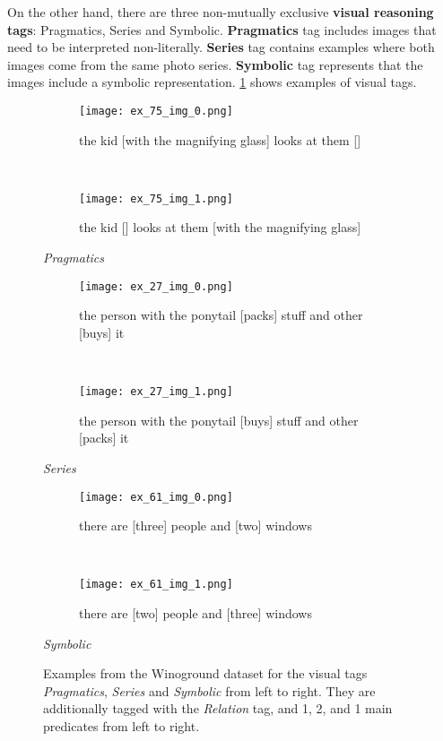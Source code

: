 On the other hand, there are three non-mutually exclusive \textbf{visual reasoning tags}: Pragmatics, Series and Symbolic. \textbf{Pragmatics} tag includes images that need to be interpreted non-literally. \textbf{Series} tag contains examples where both images come from the same photo series. \textbf{Symbolic} tag represents that the images include a symbolic representation. \cref{fig:winoground-examples-visual} shows examples of visual tags.

\begin{figure}[ht]
\centering
    \begin{minipage}{.30\textwidth}
        \begin{subfigure}{\textwidth}
        \centering
        \texttt{[image: ex\_75\_img\_0.png]}
        \caption{the kid [with the magnifying glass] looks at them []}
        \end{subfigure}\\
        \begin{subfigure}{\textwidth}
        \centering
        \texttt{[image: ex\_75\_img\_1.png]}
        \caption{the kid [] looks at them [with the magnifying glass]}
        \end{subfigure}%
        \caption*{\textit{Pragmatics}}
    \end{minipage}
    \hfill
    \begin{minipage}{.30\textwidth}
        \begin{subfigure}{\textwidth}
        \centering
        \texttt{[image: ex\_27\_img\_0.png]}
        \caption{the person with the ponytail [packs] stuff and other [buys] it}
        \end{subfigure}\\
        \begin{subfigure}{\textwidth}
        \centering
        \texttt{[image: ex\_27\_img\_1.png]}
        \caption{the person with the ponytail [buys] stuff and other [packs] it}
        \end{subfigure}%
        \caption*{\textit{Series}}
    \end{minipage}
    \hfill
    \begin{minipage}{.30\textwidth}
        \begin{subfigure}{\textwidth}
        \centering
        \texttt{[image: ex\_61\_img\_0.png]}
        \caption{there are [three] people and [two] windows}
        \end{subfigure}\\
        \begin{subfigure}{\textwidth}
        \centering
        \texttt{[image: ex\_61\_img\_1.png]}
        \caption{there are [two] people and [three] windows}
        \end{subfigure}%
        \caption*{\textit{Symbolic}}
    \end{minipage}
    \caption{Examples from the Winoground dataset for the visual tags \textit{Pragmatics}, \textit{Series} and \textit{Symbolic} from left to right. They are additionally tagged with the \textit{Relation} tag, and 1, 2, and 1 main predicates from left to right.}
    \label{fig:winoground-examples-visual}
\end{figure}

